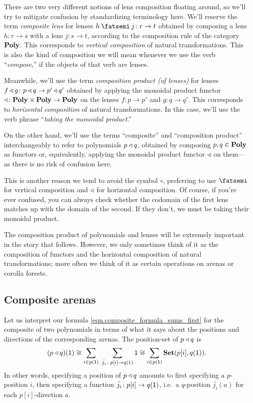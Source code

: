 \documentclass[Book-Poly]{subfiles}
\begin{document}
\begin{remark}
There are two very different notions of lens composition floating around, so we'll try to mitigate confusion by standardizing terminology here.
We'll reserve the term \emph{composite lens} for lenses $h\then j\colon r\to t$ obtained by composing a lens $h\colon r\to s$ with a lens $j\colon s\to t$, according to the composition rule of the category $\mathbf{Poly}$.
This corresponds to \emph{vertical composition} of natural transformations.
This is also the kind of composition we will mean whenever we use the verb ``\emph{compose},'' if the objects of that verb are lenses.

Meanwhile, we'll use the term \emph{composition product (of lenses)} for lenses $f\mathbin{\triangleleft} g\colon p\mathbin{\triangleleft} q\to p'\mathbin{\triangleleft} q'$ obtained by applying the monoidal product functor $\mathbin{\triangleleft}\colon\mathbf{Poly}\times\mathbf{Poly}\to\mathbf{Poly}$ on the lenses $f\colon p\to p'$ and $g\colon q\to q'$.
This corresponds to \emph{horizontal composition} of natural transformations.
In this case, we'll use the verb phrase ``\emph{taking the monoidal product}.''

On the other hand, we'll use the terms ``composite'' and ``composition product'' interchangeably to refer to polynomials $p\mathbin{\triangleleft} q$, obtained by composing $p,q\in\mathbf{Poly}$ as functors or, equivalently, applying the monoidal product functor $\mathbin{\triangleleft}$ on them---as there is no risk of confusion here.

This is another reason we tend to avoid the symbol $\circ$, preferring to use $\then$ for vertical composition and $\mathbin{\triangleleft}$ for horizontal composition.
Of course, if you're ever confused, you can always check whether the codomain of the first lens matches up with the domain of the second.
If they don't, we must be taking their monoidal product.
\end{remark}

The composition product of polynomials and lenses will be extremely important in the story that follows.
However, we only sometimes think of it as the composition of functors and the horizontal composition of natural transformations; more often we think of it as certain operations on arenas or corolla forests.

\subsection{Composite arenas}\label{subsec.comon.comp.def.arena}

Let us interpret our formula \eqref{eqn.composite_formula_sums_first} for the composite of two polynomials in terms of what it says about the positions and directions of the corresponding arenas.
The position-set of $p \mathbin{\triangleleft} q$ is
\begin{equation} \label{eqn.comp_pos}
    (p \mathbin{\triangleleft} q)(\textsf{1}) \cong \sum_{i \in p(\textsf{1})} \; \sum_{\bar{j_i} \colon p[i] \to q(1)} \textsf{1} \cong \sum_{i \in p(\textsf{1})} \mathbf{Set}(p[i], q(\textsf{1})).
\end{equation}
In other words, specifying a position of $p \mathbin{\triangleleft} q$ amounts to first specifying a $p$-position $i$, then specifying a function $\bar{j_i} \colon p[i] \to q(\textsf{1})$, i.e.\ a $q$-position $\bar{j_i}(a)$ for each $p[i]$-direction $a$.
\end{document}
